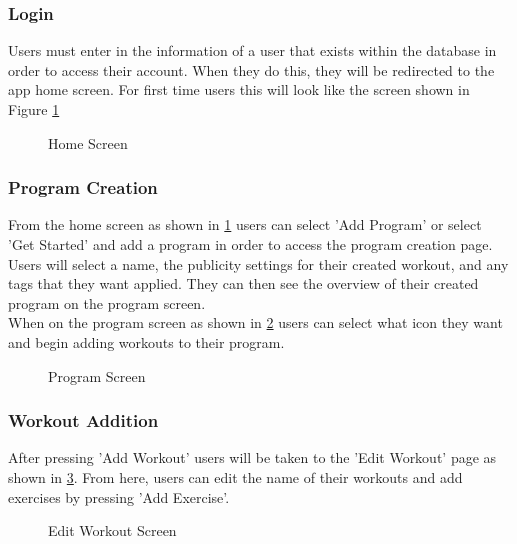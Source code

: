 \documentclass{article}
\begin{document}
\subsubsection{Login}

Users must enter in the information of a user that exists within the database in order to access their account. When they do this, they will be redirected to the app home screen. For first time users this will look like the screen shown in Figure \ref{FigHomeScreen} 

\begin{figure}[H]
    \centering
    \caption{Home Screen}
    \label{FigHomeScreen}
    \end{figure}

\subsubsection{Program Creation}

From the home screen as shown in \ref{FigHomeScreen} users can select 'Add Program' or select 'Get Started' and add a program in order to access the program creation page.\\
Users will select a name, the publicity settings for their created workout, and any tags that they want applied. They can then see the overview of their created program on the program screen.\\
When on the program screen as shown in \ref{FigProgramScreen} users can select what icon they want and begin adding workouts to their program.

\begin{figure}[H]
    \centering
    \caption{Program Screen}
    \label{FigProgramScreen}
    \end{figure}

\subsubsection{Workout Addition}

After pressing 'Add Workout' users will be taken to the 'Edit Workout' page as shown in \ref{FigEditWorkout}. From here, users can edit the name of their workouts and add exercises by pressing 'Add Exercise'.\\

\begin{figure}[H]
    \centering
    \caption{Edit Workout Screen}
    \label{FigEditWorkout}
    \end{figure}
\end{document}
